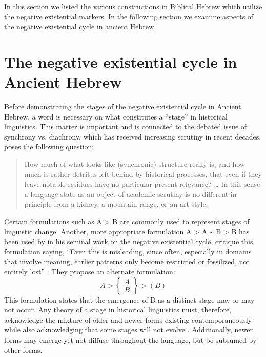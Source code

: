 ﻿\documentclass[output=paper]{langsci/langscibook}
\begin{document}
In this section we listed the various constructions in Biblical Hebrew which utilize the negative existential markers. In the following section we examine aspects of the negative existential cycle in ancient Hebrew. 

\section{The negative existential cycle in Ancient
Hebrew}\label{sec:Hebrew-3}

Before demonstrating the stages of the negative existential cycle in
Ancient Hebrew, a word is necessary on what constitutes a ``stage'' in historical linguistics. This matter is important and is connected to the debated issue of synchrony vs. diachrony, which has received increasing scrutiny in recent decades. \cite[12]{Lass1997} poses the following question:
%
\begin{quote}
How much of what looks like (synchronic) structure really is, and how much
is rather detritus left behind by historical processes, that even if they
leave notable residues have no particular present relevance? \ldots{} In this sense a language-state as an object of academic scrutiny is no different in principle from a kidney, a mountain range, or an art style. 
\end{quote}
%
Certain formulations such as A > B are commonly used to represent stages of
linguistic change. Another, more appropriate formulation A > A
{\textasciitilde} B > B has been used by \cite{Croft1991} in his seminal
work on the negative existential cycle. \citeauthor{BrintonTraugott2005} critique
this formulation saying, ``Even this is misleading, since often, especially
in domains that involve meaning, earlier patterns only become restricted or
fossilized, not entirely lost'' \parencite[6]{BrintonTraugott2005}. They propose an alternate formulation:
%
\begin{equation*}  
A > %
\left\{\begin{aligned} A\\B \end{aligned}\right\} > (B)
\end{equation*}
%
This formulation states that the emergence of B as a distinct stage may or
may not occur. Any theory of a stage in historical linguistics must,
therefore, acknowledge the mixture of older and newer forms existing
contemporaneously while also acknowledging that some stages will not evolve
\parencites(see also)()[22--25]{Croft1991}{Veselinova2016}. Additionally, newer forms may emerge yet not diffuse throughout the language, but be subsumed by other forms.
\end{document}
